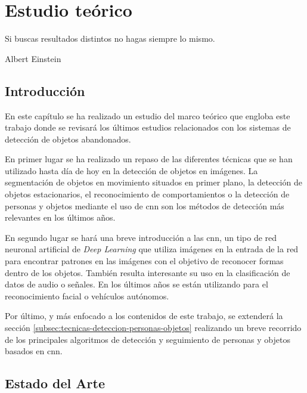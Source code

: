 
\chapter{Estudio teórico}
\label{cha:estudio-teórico}

\begin{FraseCelebre}
  \begin{Frase}
    Si buscas resultados distintos no hagas siempre lo mismo.
  \end{Frase}
  \begin{Fuente}
    Albert Einstein
  \end{Fuente}
\end{FraseCelebre}

\section{Introducción}
\label{sec:intro-sota}

En este capítulo se ha realizado un estudio del marco teórico que engloba este trabajo donde se revisará los últimos estudios relacionados con los sistemas de detección de objetos abandonados. 

En primer lugar se ha realizado un repaso de las diferentes técnicas que se han utilizado hasta día de hoy en la detección de objetos en imágenes. La segmentación de objetos en movimiento situados en primer plano, la detección de objetos estacionarios, el reconocimiento de comportamientos o la detección de personas y objetos mediante el uso de \gls{cnn} son los métodos de detección más relevantes en los últimos años.

En segundo lugar se hará una breve introducción a las \gls{cnn}, un tipo de red neuronal artificial de \textit{Deep Learning} que utiliza imágenes en la entrada de la red para encontrar patrones en las imágenes con el objetivo de reconocer formas dentro de los objetos. También resulta interesante su uso en la clasificación de datos de audio o señales. En los últimos años se están utilizando para el reconocimiento facial o vehículos autónomos.

Por último, y más enfocado a los contenidos de este trabajo, se extenderá la sección \ref{subsec:tecnicas-deteccion-personas-objetos} realizando un breve recorrido de los principales algoritmos de detección y seguimiento de personas y objetos basados en \gls{cnn}.

\section{Estado del Arte}
\label{sec:estado-del-arte}

